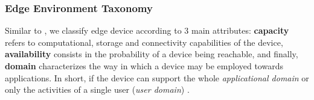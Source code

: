 \subsubsection{Edge Environment Taxonomy} \label{subsec:edge_taxonomy}

Similar to \cite{Leitao2018}, we classify edge device according to 3 main attributes: \textbf{capacity} refers to computational, storage and connectivity capabilities of the device,  \textbf{availability} consists in the probability of a device being reachable, and finally, \textbf{domain} characterizes the way in which a device may be employed towards applications. In short, if the device can support the whole \textit{applicational domain} or only the activities of a single user (\textit{user domain}) .

\begin{table}[!htb]
    \caption{Taxonomy of the edge environment}
    \begin{minipage}{.45\linewidth}
        \centering
    \end{minipage} %
    \begin{minipage}{.45\linewidth}
        \centering
    \end{minipage} 
    \label{tab:taxonomy_edge}
\end{table}


